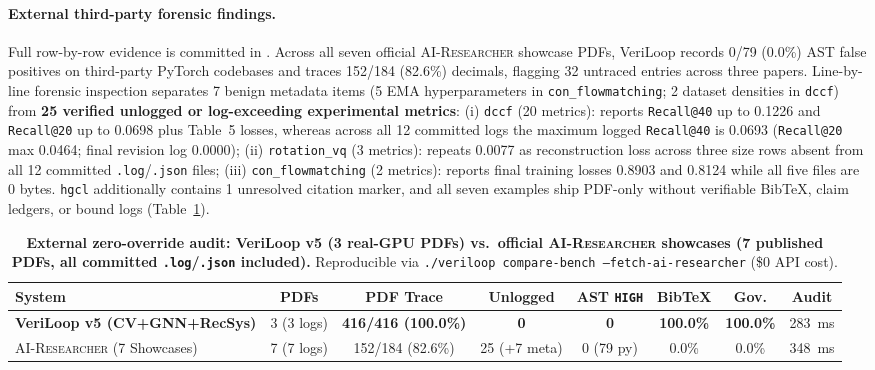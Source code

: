 \paragraph{External third-party forensic findings.}
Full row-by-row evidence is committed in .
Across all seven official \textsc{AI-Researcher} showcase PDFs, VeriLoop records 0/79 (0.0\%) AST false positives on third-party PyTorch codebases and traces 152/184 (82.6\%) decimals, flagging 32 untraced entries across three papers.
Line-by-line forensic inspection separates 7 benign metadata items (5 EMA hyperparameters in \texttt{con\_flowmatching}; 2 dataset densities in \texttt{dccf}) from \textbf{25 verified unlogged or log-exceeding experimental metrics}:
(i) \texttt{dccf} (20 metrics): reports \texttt{Recall@40} up to 0.1226 and \texttt{Recall@20} up to 0.0698 plus Table~5 losses, whereas across all 12 committed logs the maximum logged \texttt{Recall@40} is 0.0693 (\texttt{Recall@20} max 0.0464; final revision log 0.0000);
(ii) \texttt{rotation\_vq} (3 metrics): repeats 0.0077 as reconstruction loss across three size rows absent from all 12 committed \texttt{.log}/\texttt{.json} files;
(iii) \texttt{con\_flowmatching} (2 metrics): reports final training losses 0.8903 and 0.8124 while all five  files are 0 bytes.
\texttt{hgcl} additionally contains 1 unresolved citation marker, and all seven examples ship PDF-only without verifiable BibTeX, claim ledgers, or bound logs (Table~\ref{tab:app_external}).

\begin{table}[h]
\centering
\caption{\textbf{External zero-override audit: VeriLoop v5 (3 real-GPU PDFs) vs.\ official \textsc{AI-Researcher} showcases (7 published PDFs, all committed \texttt{.log}/\texttt{.json} included).} Reproducible via \texttt{./veriloop compare-bench --fetch-ai-researcher} (\$0 API cost).}
\label{tab:app_external}
\setlength{\tabcolsep}{3.0pt}
\scriptsize
\begin{tabular}{lccccccc}
\toprule
\textbf{System} & \textbf{PDFs} & \textbf{PDF Trace} & \textbf{Unlogged} & \textbf{AST \texttt{HIGH}} & \textbf{BibTeX} & \textbf{Gov.} & \textbf{Audit} \\
\midrule
\textbf{VeriLoop v5 (CV+GNN+RecSys)} & 3 (3 logs) & \textbf{416/416 (100.0\%)} & \textbf{0} & \textbf{0} & \textbf{100.0\%} & \textbf{100.0\%} & 283~ms \\
\textsc{AI-Researcher} (7 Showcases) & 7 (7 logs) & 152/184 (82.6\%) & 25 (+7 meta) & 0 (79 py) & 0.0\% & 0.0\% & 348~ms \\
\bottomrule
\end{tabular}
\end{table}
